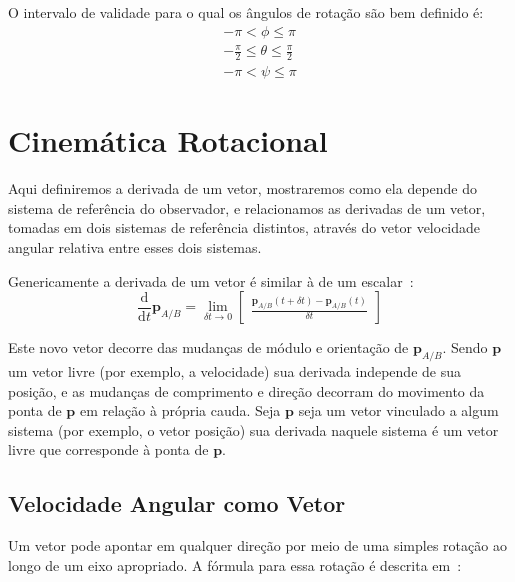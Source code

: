 O intervalo de validade para o qual os ângulos de rotação são bem definido\footnotemark{} é:
\begin{align*}
    -\pi  < \phi \leq \pi \\
    -\frac{\pi}{2} \leq \theta \leq \frac{\pi}{2} \\
    -\pi < \psi \leq \pi
\end{align*}


\section{Cinemática Rotacional}

Aqui definiremos a derivada de um vetor, mostraremos como ela depende do sistema de referência do observador, e relacionamos as derivadas de um vetor, tomadas em dois sistemas de referência distintos, através do vetor velocidade angular relativa entre esses dois sistemas.

Genericamente a derivada de um vetor é similar à de um escalar~\cite{Stevens2016}:
\begin{equation*}
    \frac{\mathrm{d}}{\mathrm{d}t} \mathbf{p}_{A/B} =  \lim_{\delta t \rightarrow 0 } \begin{bmatrix}
        \displaystyle\frac{\mathbf{p}_{A/B} (t + \delta t) - \mathbf{p}_{A/B} (t) }{\delta t}
    \end{bmatrix}
\end{equation*}

Este novo vetor decorre das mudanças de módulo e orientação de \(\mathbf{p}_{A/B}\). Sendo \(\mathbf{p}\) um vetor livre (por exemplo, a velocidade) sua derivada independe de sua posição, e as mudanças de comprimento e direção decorram do movimento da ponta de \(\mathbf{p}\) em relação à própria cauda. Seja \(\mathbf{p}\) seja um vetor vinculado a algum sistema (por exemplo, o vetor posição) sua derivada naquele sistema é um vetor livre que corresponde à ponta de \(\mathbf{p}\).

\subsection{Velocidade Angular como Vetor}

Um vetor pode apontar em qualquer direção por meio de uma simples rotação ao longo de um eixo apropriado. A fórmula para essa rotação é descrita em~\cite{Goldstein1980}:

